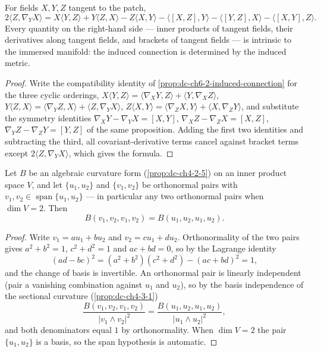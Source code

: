 \begin{lemma}
  \label{lem:dc-ch6-2-7-koszul}


  For fields $X,Y,Z$ tangent to the patch,
  $$
  2\langle Z,\nabla_YX\rangle
    = X\langle Y,Z\rangle + Y\langle Z,X\rangle - Z\langle X,Y\rangle
      - \langle[X,Z],Y\rangle - \langle[Y,Z],X\rangle - \langle[X,Y],Z\rangle.
  $$
  Every quantity on the right-hand side — inner products of tangent fields,
  their derivatives along tangent fields, and brackets of tangent fields — is
  intrinsic to the immersed manifold: the induced connection is determined by
  the induced metric.
\end{lemma}
\begin{proof}

  \sketch
  Write the compatibility identity of \cref{prop:dc-ch6-2-induced-connection}
  for the three cyclic orderings,
  $X\langle Y,Z\rangle=\langle\nabla_XY,Z\rangle+\langle Y,\nabla_XZ\rangle$,
  $Y\langle Z,X\rangle=\langle\nabla_YZ,X\rangle+\langle Z,\nabla_YX\rangle$,
  $Z\langle X,Y\rangle=\langle\nabla_ZX,Y\rangle+\langle X,\nabla_ZY\rangle$,
  and substitute the symmetry identities
  $\nabla_XY-\nabla_YX=[X,Y]$, $\nabla_XZ-\nabla_ZX=[X,Z]$,
  $\nabla_YZ-\nabla_ZY=[Y,Z]$ of the same proposition. Adding the first two
  identities and subtracting the third, all covariant-derivative terms cancel
  against bracket terms except $2\langle Z,\nabla_YX\rangle$, which gives the
  formula.
\end{proof}

\begin{lemma}
  \label{lem:dc-ch6-2-7-plane}


  Let $B$ be an algebraic curvature form (\cref{prop:dc-ch4-2-5}) on an inner
  product space $V$, and let $\{u_1,u_2\}$ and $\{v_1,v_2\}$ be orthonormal
  pairs with $v_1,v_2\in\operatorname{span}\{u_1,u_2\}$ — in particular any two
  orthonormal pairs when $\dim V=2$. Then
  $$
  B(v_1,v_2,v_1,v_2)=B(u_1,u_2,u_1,u_2).
  $$
\end{lemma}
\begin{proof}

  \sketch
  Write $v_1=au_1+bu_2$ and $v_2=cu_1+du_2$. Orthonormality of the two pairs
  gives $a^2+b^2=1$, $c^2+d^2=1$ and $ac+bd=0$, so by the Lagrange identity
  $$
  (ad-bc)^2=(a^2+b^2)(c^2+d^2)-(ac+bd)^2=1,
  $$
  and the change of basis is invertible. An orthonormal pair is linearly
  independent (pair a vanishing combination against $u_1$ and $u_2$), so by
  the basis independence of the sectional curvature (\cref{prop:dc-ch4-3-1})
  $$
  \frac{B(v_1,v_2,v_1,v_2)}{|v_1\wedge v_2|^2}
    =\frac{B(u_1,u_2,u_1,u_2)}{|u_1\wedge u_2|^2},
  $$
  and both denominators equal $1$ by orthonormality. When $\dim V=2$ the pair
  $\{u_1,u_2\}$ is a basis, so the span hypothesis is automatic.
\end{proof}

